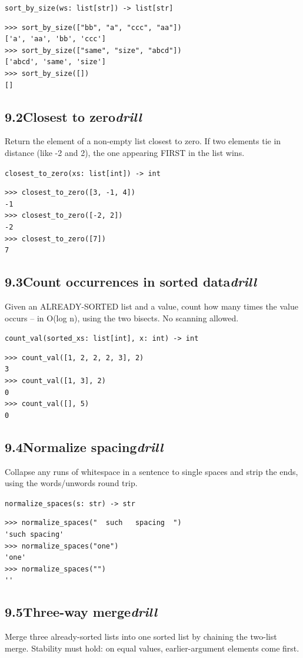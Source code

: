 \documentclass[10pt,letterpaper]{book}
\begin{document}
\noindent\texttt{sort\_by\_size(ws: list[str]) -> list[str]}
\begin{lstlisting}[style=ex]
>>> sort_by_size(["bb", "a", "ccc", "aa"])
['a', 'aa', 'bb', 'ccc']
>>> sort_by_size(["same", "size", "abcd"])
['abcd', 'same', 'size']
>>> sort_by_size([])
[]
\end{lstlisting}
\subsection*{9.2\quad Closest to zero\hfill\textnormal{\textit{drill}}}
Return the element of a non-empty list closest to zero. If two elements tie in distance (like -2 and 2), the one appearing FIRST in the list wins.

\noindent\texttt{closest\_to\_zero(xs: list[int]) -> int}
\begin{lstlisting}[style=ex]
>>> closest_to_zero([3, -1, 4])
-1
>>> closest_to_zero([-2, 2])
-2
>>> closest_to_zero([7])
7
\end{lstlisting}
\subsection*{9.3\quad Count occurrences in sorted data\hfill\textnormal{\textit{drill}}}
Given an ALREADY-SORTED list and a value, count how many times the value occurs -- in O(log n), using the two bisects. No scanning allowed.

\noindent\texttt{count\_val(sorted\_xs: list[int], x: int) -> int}
\begin{lstlisting}[style=ex]
>>> count_val([1, 2, 2, 2, 3], 2)
3
>>> count_val([1, 3], 2)
0
>>> count_val([], 5)
0
\end{lstlisting}
\subsection*{9.4\quad Normalize spacing\hfill\textnormal{\textit{drill}}}
Collapse any runs of whitespace in a sentence to single spaces and strip the ends, using the words/unwords round trip.

\noindent\texttt{normalize\_spaces(s: str) -> str}
\begin{lstlisting}[style=ex]
>>> normalize_spaces("  such   spacing  ")
'such spacing'
>>> normalize_spaces("one")
'one'
>>> normalize_spaces("")
''
\end{lstlisting}
\subsection*{9.5\quad Three-way merge\hfill\textnormal{\textit{drill}}}
Merge three already-sorted lists into one sorted list by chaining the two-list merge. Stability must hold: on equal values, earlier-argument elements come first.
\end{document}
